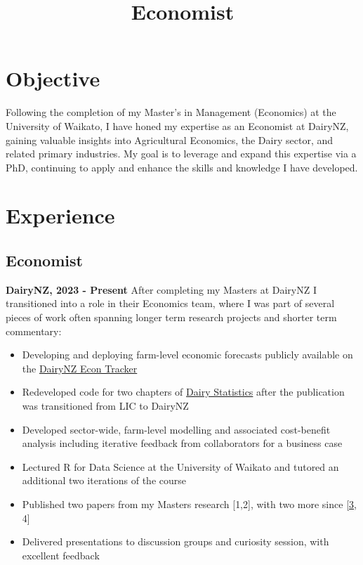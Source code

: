 \documentclass[11pt,a4paper,]{moderncv}
\title{Economist}
\providecommand{\tightlist}{%
	\setlength{\itemsep}{0pt}\setlength{\parskip}{0pt}}
\begin{document}
\makecvtitle



\section{Objective}\label{objective}

Following the completion of my Master's in Management (Economics) at the
University of Waikato, I have honed my expertise as an Economist at
DairyNZ, gaining valuable insights into Agricultural Economics, the
Dairy sector, and related primary industries. My goal is to leverage and
expand this expertise via a PhD, continuing to apply and enhance the
skills and knowledge I have developed.

\section{Experience}\label{experience}

\subsection{Economist}\label{economist}

\textbf{DairyNZ, 2023 - Present} \newline After completing my Masters at
DairyNZ I transitioned into a role in their Economics team, where I was
part of several pieces of work often spanning longer term research
projects and shorter term commentary:

\begin{itemize}
\tightlist
\item
  Developing and deploying farm-level economic forecasts publicly
  available on the
  \href{https://connect.dairynz.co.nz/content/89ba1084-42c5-4786-882b-cc91b8016d05/}{DairyNZ
  Econ Tracker}
\item
  Redeveloped code for two chapters of
  \href{https://connect.dairynz.co.nz/2022-23_Dairy_Statistics/}{Dairy
  Statistics} after the publication was transitioned from LIC to DairyNZ
\item
  Developed sector-wide, farm-level modelling and associated
  cost-benefit analysis including iterative feedback from collaborators
  for a business case
\item
  Lectured R for Data Science at the University of Waikato and tutored
  an additional two iterations of the course
\item
  Published two papers from my Masters research {[}1,2{]}, with two more
  since
  {[}\href{https://www.researchgate.net/publication/388173097_Enabling_data_science_at_DairyNZ_with_Modern_Science_Workflows}{3},
  4{]}
\item
  Delivered presentations to discussion groups and curiosity session,
  with excellent feedback
\end{itemize}
\end{document}
